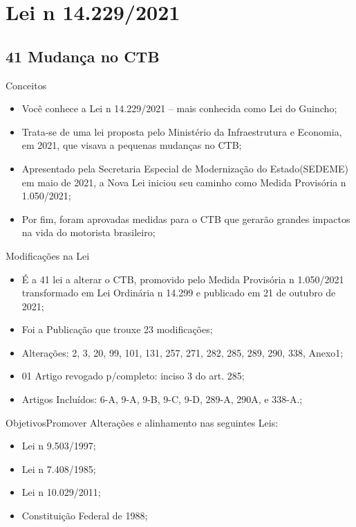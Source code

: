 \documentclass{beamer}
\begin{document}
\section{Lei n 14.229/2021}
\subsection{41 Mudança no CTB}
\begin{frame}{Conceitos}
    \begin{itemize}
        \item \justifying Você conhece a Lei n 14.229/2021 – mais conhecida como Lei do Guincho;
        \item \justifying Trata-se de uma lei proposta pelo Ministério da Infraestrutura e Economia, em 2021, que visava a pequenas mudanças no CTB;
        \item \justifying Apresentado pela Secretaria Especial de Modernização do Estado(SEDEME) em maio de 2021, a Nova Lei iniciou seu caminho como Medida Provisória n 1.050/2021;
        \item \justifying Por fim, foram aprovadas medidas para o CTB que gerarão grandes impactos na vida do motorista brasileiro;
    \end{itemize}
\end{frame}
\begin{frame}{Modificações na Lei}
    \begin{itemize}
        \item \justifying É a 41 lei a alterar o CTB, promovido pelo Medida Provisória n 1.050/2021 transformado em Lei Ordinária n 14.299 e publicado em 21 de outubro de 2021;
        \item Foi a Publicação que trouxe 23 modificações;
        \item {} Alterações: 2, 3, 20, 99, 101, 131, 257, 271, 282, 285, 289, 290, 338, Anexo1;
        \item 01 Artigo revogado p/completo: inciso 3 do art. 285;
        \item {} Artigos Incluídos: 6-A, 9-A, 9-B, 9-C, 9-D, 289-A, 290A, e 338-A.;
    \end{itemize}
\end{frame}
\begin{frame}{Objetivos}{Promover Alterações e alinhamento nas seguintes Leis:}
    \begin{itemize}
        \item Lei n 9.503/1997;
        \item Lei n 7.408/1985;
        \item Lei n 10.029/2011;
        \item Constituição Federal de 1988;
    \end{itemize}
\end{frame}
\end{document}
